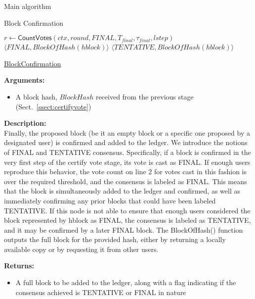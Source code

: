 \documentclass[10pt,a4paper]{article}
\begin{document}
\begin{section}{Main algorithm}
\begin{subsection}{Block Confirmation}
\begin{algorithm}[H]
\begin{algorithmic}[H]
    \State $r \gets \mathsf{CountVotes}(ctx, round, FINAL, T_{final}, \tau_{final}, lstep)$
        \State \Return $\langle FINAL, BlockOfHash(hblock)\rangle$ 
    \Else
    {
        \State \Return $\langle TENTATIVE, BlockOfHash(hblock)\rangle $
    }
    \EndIf
    \EndFunction
    \end{algorithmic}
    \caption{\underline{BlockConfirmation}}
\end{algorithm}


\noindent \textbf{Arguments:}
\begin{itemize}
    \item A block hash, $BlockHash$ received from the previous stage (Sect.~\ref{ssect:certifyvote})
  \end{itemize}

\noindent \textbf{Description:}\\
Finally, the proposed block (be it an empty block or a specific one 
proposed by a designated user) is confirmed and added to the ledger.
We introduce the notions of FINAL and TENTATIVE consensus.
Specifically, if a block is confirmed in the very first step of the
certify vote stage, its vote is cast as FINAL.
If enough users reproduce this behavior, the vote count on line 2 for 
votes cast in this fashion is over the required threshold, and the 
consensus is labeled as FINAL.
This means that the block is simultaneously added to the ledger and 
confirmed, as well as immediately confirming any prior blocks that 
could have been labeled TENTATIVE.
If this node is not able to ensure that enough users considered the 
block represented by hblock as FINAL, the consensus is labeled as 
TENTATIVE, and it may be confirmed by a later FINAL block.
The BlockOfHash() function outputs the full block for the provided 
hash, either by returning a locally available copy or by requesting 
it from other users.

\noindent \textbf{Returns:}
\begin{itemize}
    \item A full block to be added to the ledger, along with a flag indicating if
    the consensus achieved is TENTATIVE or FINAL in nature
  \end{itemize}

\end{subsection}
\end{section}
\end{document}
